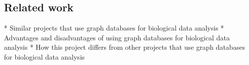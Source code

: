 \subsection{Related work} \label{subsec:related_work}
{\color{lightgray}
* Similar projects that use graph databases for biological data analysis
* Advantages and disadvantages of using graph databases for biological data analysis
* How this project differs from other projects that use graph databases for biological data analysis
}